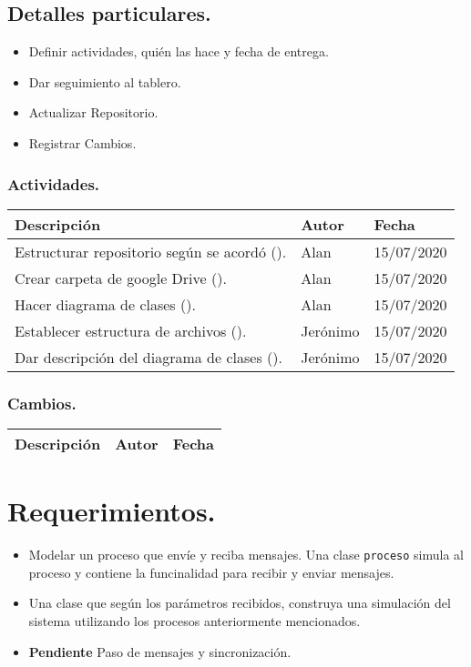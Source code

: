 \documentclass[a4paper,12pt]{article}
\begin{document}
\subsection{Detalles particulares.}{
\begin{itemize}
  \item{Definir actividades, quién las hace y fecha de entrega.}
  \item{Dar seguimiento al tablero.}
  \item{Actualizar Repositorio.}
  \item{Registrar Cambios.}
\end{itemize}
\subsubsection{Actividades.}{
  \begin{center}
  \begin{tabular}{  p{} | p{} | p{}}
    Descripción & Autor & Fecha \\\hline\hline
    Estructurar repositorio según se acordó (\nameref{enlaces}). & Alan &
      15/07/2020 \\\hline
    Crear carpeta de google Drive (\nameref{enlaces}). & Alan &
    15/07/2020 \\\hline
    Hacer diagrama de clases (\nameref{clases}). & Alan &
      15/07/2020 \\\hline
    Establecer estructura de archivos (\nameref{paquetes}). & Jerónimo &
      15/07/2020 \\\hline
    Dar descripción del diagrama de clases (\nameref{clases}). & Jerónimo &
      15/07/2020 \\\hline
  \end{tabular}
  \end{center}
}
\subsubsection{Cambios.}{
  \begin{center}
  \begin{tabular}{  p{} | p{} | p{}}
    Descripción & Autor & Fecha \\\hline\hline
  \end{tabular}
  \end{center}
}
}

\section{Requerimientos.}
\begin{itemize}
  \item{Modelar un proceso que envíe y reciba mensajes. Una clase
    \texttt{proceso} simula al proceso y contiene la funcinalidad para recibir y
    enviar mensajes.
  }
  \item{Una clase que según los parámetros recibidos, construya una simulación
    del sistema utilizando los procesos anteriormente mencionados.
  }
  \item{\textbf{Pendiente} Paso de mensajes y sincronización.}
\end{itemize}
\end{document}
